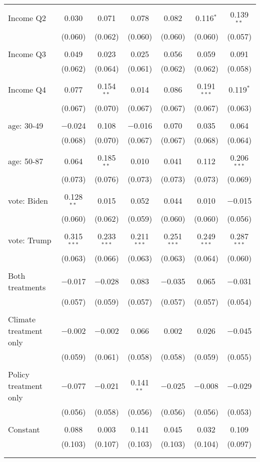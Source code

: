 \begin{tabular}{@{\extracolsep{5pt}}lcccccc}
  & & & & & & \\ 
 Income Q2 & 0.030 & 0.071 & 0.078 & 0.082 & 0.116$^{*}$ & 0.139$^{**}$ \\ 
  & (0.060) & (0.062) & (0.060) & (0.060) & (0.060) & (0.057) \\ 
  & & & & & & \\ 
 Income Q3 & 0.049 & 0.023 & 0.025 & 0.056 & 0.059 & 0.091 \\ 
  & (0.062) & (0.064) & (0.061) & (0.062) & (0.062) & (0.058) \\ 
  & & & & & & \\ 
 Income Q4 & 0.077 & 0.154$^{**}$ & 0.014 & 0.086 & 0.191$^{***}$ & 0.119$^{*}$ \\ 
  & (0.067) & (0.070) & (0.067) & (0.067) & (0.067) & (0.063) \\ 
  & & & & & & \\ 
 age: 30-49 & $-$0.024 & 0.108 & $-$0.016 & 0.070 & 0.035 & 0.064 \\ 
  & (0.068) & (0.070) & (0.067) & (0.067) & (0.068) & (0.064) \\ 
  & & & & & & \\ 
 age: 50-87 & 0.064 & 0.185$^{**}$ & 0.010 & 0.041 & 0.112 & 0.206$^{***}$ \\ 
  & (0.073) & (0.076) & (0.073) & (0.073) & (0.073) & (0.069) \\ 
  & & & & & & \\ 
 vote: Biden & 0.128$^{**}$ & 0.015 & 0.052 & 0.044 & 0.010 & $-$0.015 \\ 
  & (0.060) & (0.062) & (0.059) & (0.060) & (0.060) & (0.056) \\ 
  & & & & & & \\ 
 vote: Trump & 0.315$^{***}$ & 0.233$^{***}$ & 0.211$^{***}$ & 0.251$^{***}$ & 0.249$^{***}$ & 0.287$^{***}$ \\ 
  & (0.063) & (0.066) & (0.063) & (0.063) & (0.064) & (0.060) \\ 
  & & & & & & \\ 
 Both treatments & $-$0.017 & $-$0.028 & 0.083 & $-$0.035 & 0.065 & $-$0.031 \\ 
  & (0.057) & (0.059) & (0.057) & (0.057) & (0.057) & (0.054) \\ 
  & & & & & & \\ 
 Climate treatment only & $-$0.002 & $-$0.002 & 0.066 & 0.002 & 0.026 & $-$0.045 \\ 
  & (0.059) & (0.061) & (0.058) & (0.058) & (0.059) & (0.055) \\ 
  & & & & & & \\ 
 Policy treatment only & $-$0.077 & $-$0.021 & 0.141$^{**}$ & $-$0.025 & $-$0.008 & $-$0.029 \\ 
  & (0.056) & (0.058) & (0.056) & (0.056) & (0.056) & (0.053) \\ 
  & & & & & & \\ 
 Constant & 0.088 & 0.003 & 0.141 & 0.045 & 0.032 & 0.109 \\ 
  & (0.103) & (0.107) & (0.103) & (0.103) & (0.104) & (0.097) \\ 
  & & & & & & \\ 
\hline \\[-1.8ex] 


\end{tabular}
